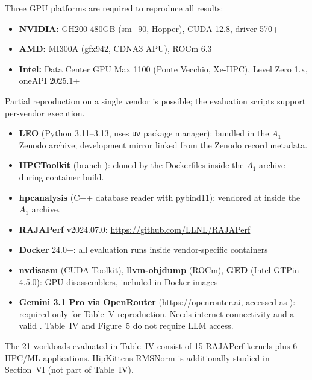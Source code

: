 \documentclass[conference]{IEEEtran}
\begin{document}
\artin


Three GPU platforms are required to reproduce all results:
\begin{itemize}
\item \textbf{NVIDIA:} GH200 480GB (sm\_90, Hopper), CUDA 12.8, driver 570+
\item \textbf{AMD:} MI300A (gfx942, CDNA3 APU), ROCm 6.3
\item \textbf{Intel:} Data Center GPU Max 1100 (Ponte Vecchio, Xe-HPC), Level Zero 1.x, oneAPI 2025.1+
\end{itemize}
Partial reproduction on a single vendor is possible; the evaluation scripts support per-vendor execution.


\begin{itemize}
\item \textbf{LEO} (Python 3.11--3.13, uses \texttt{uv} package manager): bundled in the $A_1$ Zenodo archive; development mirror linked from the Zenodo record metadata.
\item \textbf{HPCToolkit} (branch ): cloned by the Dockerfiles inside the $A_1$ archive during container build.
\item \textbf{hpcanalysis} (C++ database reader with pybind11): vendored at  inside the $A_1$ archive.
\item \textbf{RAJAPerf} v2024.07.0: \url{https://github.com/LLNL/RAJAPerf}
\item \textbf{Docker} 24.0+: all evaluation runs inside vendor-specific containers
\item \textbf{nvdisasm} (CUDA Toolkit), \textbf{llvm-objdump} (ROCm), \textbf{GED} (Intel GTPin 4.5.0): GPU disassemblers, included in Docker images
\item \textbf{Gemini 3.1 Pro via OpenRouter} (\url{https://openrouter.ai}, accessed as ): required only for Table~V reproduction. Needs internet connectivity and a valid . Table~IV and Figure~5 do not require LLM access.
\end{itemize}


The 21 workloads evaluated in Table~IV consist of 15 RAJAPerf kernels plus 6 HPC/ML applications. HipKittens RMSNorm is additionally studied in Section~VI (not part of Table~IV).
\end{document}
